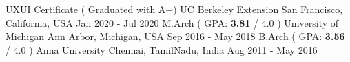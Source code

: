 \vspace{-0.3cm}


\begin{cventries}
  \cventry
  {UXUI Certificate ( Graduated with A+)} %
  {UC Berkeley Extension} %
  {San Francisco, California, USA} %
  {Jan 2020 - Jul 2020} %
  {
  }
\vspace{-0.3cm}
  \cventry
  {M.Arch ( GPA: {\small \textbf{3.81} / 4.0} ) } %
  {University of Michigan} %
  {Ann Arbor, Michigan, USA} %
  {Sep 2016 - May 2018} %
  {
  }
\vspace{-0.3cm}
 \cventry
  {B.Arch ( GPA: {\small \textbf{3.56} / 4.0} ) } %
  {Anna University} %
  {Chennai, TamilNadu, India} %
  {Aug 2011 - May 2016} %
  {
  }
\vspace{-0.7cm}
\end{cventries}
